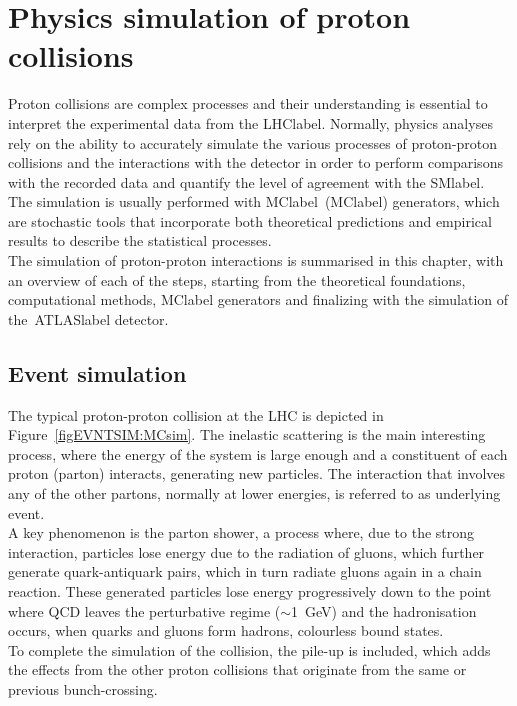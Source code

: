 \chapter{Physics simulation of proton collisions}
\label{chapter:EventSim}

Proton collisions are complex processes and their understanding is essential to interpret the experimental data from the \acrshort{LHClabel}. Normally, physics analyses rely on the ability to accurately simulate the various processes of proton-proton collisions and the interactions with the detector in order to perform comparisons with the recorded data and quantify the level of agreement with the \acrshort{SMlabel}. The simulation is usually performed with \acrlong{MClabel}~(\acrshort{MClabel}) generators, which are stochastic tools that incorporate both theoretical predictions and empirical results to describe the statistical processes.\\

The simulation of proton-proton interactions is summarised in this chapter, with an overview of each of the steps, starting from the theoretical foundations, computational methods, \acrshort{MClabel} generators and finalizing with the simulation of the~\acrshort{ATLASlabel} detector.

\section{Event simulation}

The typical proton-proton collision at the LHC is depicted in Figure~\ref{figEVNTSIM:MCsim}. The inelastic scattering is the main interesting process, where the energy of the system is large enough and a constituent of each proton (parton) interacts, generating new particles. The interaction that involves any of the other partons, normally at lower energies, is referred to as underlying event.\\

A key phenomenon is the parton shower, a process where, due to the strong interaction, particles lose energy due to the radiation of gluons, which further generate quark-antiquark pairs, which in turn radiate gluons again in a chain reaction. These generated particles lose energy progressively down to the point where \acrshort{QCD} leaves the perturbative regime ($\sim$1~GeV) and the hadronisation occurs, when quarks and gluons form hadrons, colourless bound states.\\

To complete the simulation of the collision, the pile-up is included, which adds the effects from the other proton collisions that originate from the same or previous bunch-crossing.  

